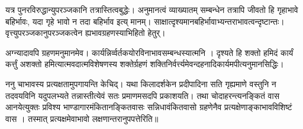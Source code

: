 य\mms त्र पुनरविरुद्धान्युपर\mme ञ्जकानि तत्रास्तित्वबुद्धेः।
अनुमानत्वं व्याख्यातम्
सम्बन्धेन तत्रापि जीवतो हि %
गृहाभावे बहिर्भावः, यदा गृहे भावो न तदा बहिर्भाव \mms इत्य्
मानम्। सा\mme क्षात्दृश्यमानबहिर्भावाभ्यन्तराभावत्वन्दृष्टान्तः। %
वृत्त्युपरञ्जकानुपरञ्जकत्वेन ह्यभावग्रहणस्याभिहितो हेतुर्। %

अग्न्य\mms ादावपि ग्रहणमनुमानमेव।
कार्यन्निर्व्व\mms र्तकयोरविनाभावसम्बन्धस्यात्मनि
। दृश्यते हि
%
शक्तो हमिदं कार्यं कर्त्तुं अशक्तो हमित्यात्मवदात्मविशेषण\mms स्य शक्तेर्ग्रहणं शक्तिनिर्व\mme र्त्त्यमेवन्दहनादिकार्य\mms मपीत्यनुमानसिद्धिः। %

ननु चाभावस्य प्रत्यक्षतामुपगायन्ति केचिद्। यथा किलादर्शकेन प्रदीपादि\mme ना सति गृह्यमाणे वस्तुनि न तदवयविनि यदुप\mms लभ्यते तन्नास्तीत्येवं सतः %
प्र\mme माणमसदपि प्रका\mms शयति। %
तथा चोदाहरन्त्यनङ्कितं वास आनयेत्युक्तः प्रविश्य भाण्डागारमंकितानङ्कितवासः सन्नि\mme धावंकितवासो ग्रहणेनैव प्रत्यक्षेण\mms ाङ्काभावविशिष्टं वास । तस्मात्\mme%
प्रत्यक्षमेवाभा\mms वो लक्षणान्तरानुपपत्तेरिति॥ %

